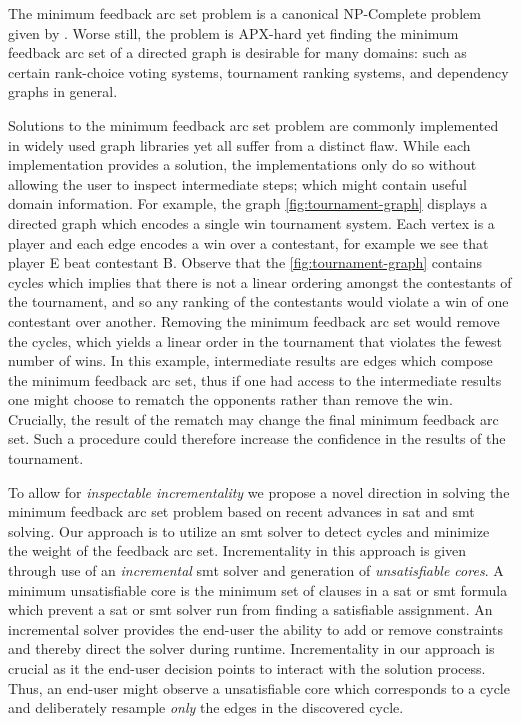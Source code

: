\label{section:introduction}%

The minimum feedback arc set problem is a canonical NP-Complete problem given
by \citet{KarpNPComplete}. Worse still, the problem is
APX-hard yet finding the minimum feedback arc set
of a directed graph is desirable for many domains: such as certain rank-choice
voting systems, tournament ranking systems, and dependency graphs in
general.

Solutions to the minimum feedback arc set problem are commonly implemented in
widely used graph libraries yet all suffer from a distinct flaw. While each
implementation provides a solution, the implementations only do so without
allowing the user to inspect intermediate steps; which might contain useful
domain information. For example, the graph \autoref{fig:tournament-graph}
displays a directed graph which encodes a single win tournament system. Each
vertex is a player and each edge encodes a win over a contestant, for example we
see that player E beat contestant B. Observe that the
\autoref{fig:tournament-graph} contains cycles which implies that there is not a
linear ordering amongst the contestants of the tournament, and so any ranking of
the contestants would violate a win of one contestant over another. Removing the
minimum feedback arc set would remove the cycles, which yields a linear order in
the tournament that violates the fewest number of wins. In this example,
intermediate results are edges which compose the minimum feedback arc set, thus
if one had access to the intermediate results one might choose to rematch the
opponents rather than remove the win. Crucially, the result of the rematch may
change the final minimum feedback arc set. Such a procedure could therefore
increase the confidence in the results of the tournament.

To allow for \emph{inspectable incrementality} we propose a novel direction in solving the minimum feedback arc set problem based on
recent advances in \ac{sat} and \ac{smt} solving. Our approach is to utilize an
\ac{smt} solver to detect cycles and minimize the weight of the feedback arc
set. Incrementality in this approach is given through use of an
\emph{incremental} \ac{smt} solver and generation of \emph{unsatisfiable cores}.
A minimum unsatisfiable core is the minimum set of clauses in a \ac{sat} or
\ac{smt} formula which prevent a \ac{sat} or \ac{smt} solver run from finding a
satisfiable assignment. An incremental solver provides the end-user the ability
to add or remove constraints and thereby direct the solver during runtime.
Incrementality in our approach is crucial as it the end-user decision points to
interact with the solution process. Thus, an end-user might observe a
unsatisfiable core which corresponds to a cycle and deliberately resample
\emph{only} the edges in the discovered cycle.

